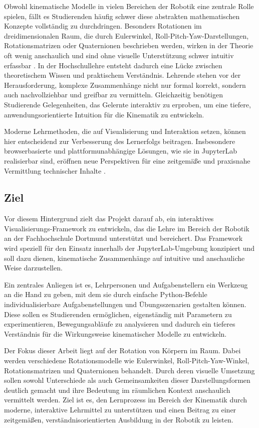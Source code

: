 Obwohl kinematische Modelle in vielen Bereichen der Robotik eine zentrale Rolle spielen, fällt es Studierenden häufig schwer
diese abstrakten mathematischen Konzepte vollständig zu durchdringen. Besonders Rotationen im dreidimensionalen Raum, die durch Eulerwinkel,
Roll-Pitch-Yaw-Darstellungen, Rotationsmatrizen oder Quaternionen beschrieben werden, wirken in der Theorie oft wenig anschaulich und sind ohne visuelle
Unterstützung schwer intuitiv erfassbar .
In der Hochschullehre entsteht dadurch eine Lücke zwischen theoretischem Wissen und praktischem Verständnis.
Lehrende stehen vor der Herausforderung, komplexe Zusammenhänge nicht nur formal korrekt, sondern auch nachvollziehbar und greifbar zu vermitteln.
Gleichzeitig benötigen Studierende Gelegenheiten, das Gelernte interaktiv zu erproben, um eine tiefere, anwendungsorientierte Intuition für die Kinematik zu entwickeln.

Moderne Lehrmethoden, die auf Visualisierung und Interaktion setzen, können hier entscheidend zur Verbesserung des Lernerfolgs beitragen.
Insbesondere browserbasierte und plattformunabhängige Lösungen, wie sie in JupyterLab realisierbar sind,
eröffnen neue Perspektiven für eine zeitgemäße und praxisnahe Vermittlung technischer Inhalte .


\subsection{Ziel}
Vor diesem Hintergrund zielt das Projekt darauf ab, ein interaktives Visualisierungs-Framework zu entwickeln,
das die Lehre im Bereich der Robotik an der Fachhochschule Dortmund unterstützt und bereichert.
Das Framework wird speziell für den Einsatz innerhalb der JupyterLab-Umgebung konzipiert und soll dazu dienen,
kinematische Zusammenhänge auf intuitive und anschauliche Weise darzustellen.

Ein zentrales Anliegen ist es, Lehrpersonen und Aufgabenstellern ein Werkzeug an die Hand zu geben,
mit dem sie durch einfache Python-Befehle individualisierbare Aufgabenstellungen und Übungsszenarien gestalten können.
Diese sollen es Studierenden ermöglichen, eigenständig mit Parametern zu experimentieren,
Bewegungsabläufe zu analysieren und dadurch ein tieferes Verständnis für die Wirkungsweise kinematischer Modelle zu entwickeln.

Der Fokus dieser Arbeit liegt auf der Rotation von Körpern im Raum.
Dabei werden verschiedene Rotationsmodelle wie Eulerwinkel, Roll-Pitch-Yaw-Winkel, Rotationsmatrizen und Quaternionen behandelt.
Durch deren visuelle Umsetzung sollen sowohl Unterschiede als auch Gemeinsamkeiten dieser
Darstellungsformen deutlich gemacht und ihre Bedeutung im räumlichen Kontext anschaulich vermittelt werden.
Ziel ist es, den Lernprozess im Bereich der Kinematik durch moderne, interaktive Lehrmittel zu unterstützen und einen Beitrag zu einer zeitgemäßen,
verständnisorientierten Ausbildung in der Robotik zu leisten.



